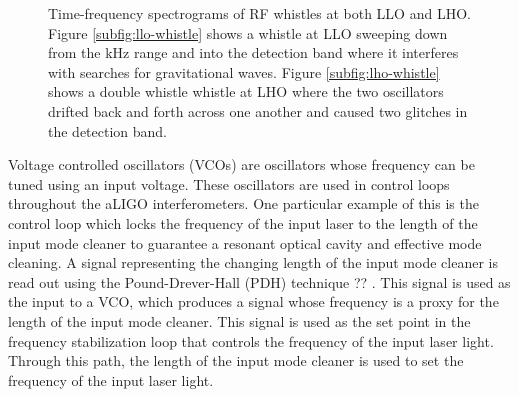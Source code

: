 \begin{figure}[ht!]%
\centering
{}
  
\caption[Spectrograms of RF whistles]{Time-frequency spectrograms of RF whistles at %
         both LLO and LHO. Figure \ref{subfig:llo-whistle} shows a %
         whistle at LLO sweeping down from the kHz range and into the detection band %
         where it interferes with searches for gravitational waves. Figure %
         \ref{subfig:lho-whistle} shows a double whistle whistle at LHO where the %
         two oscillators drifted back and forth across one another and caused two %
         glitches in the detection band.}
\label{fig:whistle-spectrograms}
\end{figure}

Voltage controlled oscillators (VCOs) are oscillators whose frequency can 
be tuned using an input voltage. These oscillators are used in control 
loops throughout the aLIGO interferometers. One particular example of this 
is the control loop which locks the frequency of the input laser to the 
length of the input mode cleaner to guarantee a resonant optical cavity and 
effective mode cleaning. A signal representing the changing length 
of the input mode cleaner is read out using the Pound-Drever-Hall (PDH) technique ?? . 
This signal is used as the input to a VCO, which produces a 
signal whose frequency is a proxy for the length of the input mode cleaner. 
This signal is used as the set point in the frequency stabilization loop that 
controls the frequency of the input laser light. Through this path, the length 
of the input mode cleaner is used to set the frequency of the input laser light. 

